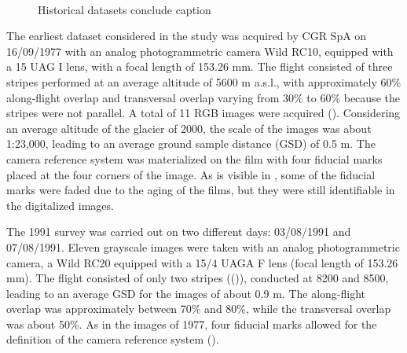 \begin{figure}
     \\
    \caption{Historical datasets {\color{red} conclude caption}}
    \label{fig:2:datasets_historical}
\end{figure}

The earliest dataset considered in the study was acquired by CGR SpA on 16/09/1977
with an analog photogrammetric camera Wild RC10, equipped with a 15 UAG I lens, with
a focal length of 153.26 mm. The flight consisted of three stripes performed at an average
altitude of 5600 m a.s.l., with approximately 60\% along-flight overlap and transversal
overlap varying from 30\% to 60\% because the stripes were not parallel. A total of 11 RGB
images were acquired (). 
Considering an average altitude of the glacier of \SI{2000}{\masl}, the scale of the images
was about 1:23,000, leading to an average ground
sample distance (GSD) of 0.5 m. The camera reference system was materialized on the film
with four fiducial marks placed at the four corners of the image. As is visible in ,
some of the fiducial marks were faded due to the aging of the films, but they were still
identifiable in the digitalized images.

The 1991 survey was carried out on two different days: 03/08/1991 and 07/08/1991.
Eleven grayscale images were taken with an analog photogrammetric camera, a Wild RC20
equipped with a 15/4 UAGA F lens (focal length of 153.26 mm). The flight consisted of only
two stripes (()), conducted at \SI{8200}{\masl} and \SI{8500}{\masl}, leading to an average
GSD for the images of about 0.9 m. The along-flight overlap was approximately between
70\% and 80\%, while the transversal overlap was about 50\%. As in the images of 1977, four
fiducial marks allowed for the definition of the camera reference system ().

